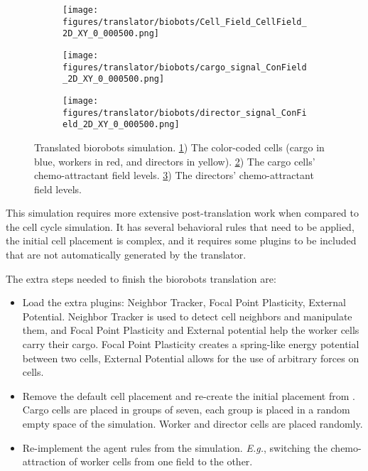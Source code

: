 \begin{figure}[H]
    \centering
    \begin{subfigure}{.45\textwidth}
        \texttt{[image: figures/translator/biobots/Cell\_Field\_CellField\_2D\_XY\_0\_000500.png]}
        \caption{}\label{fig:trans:biobot:1}
    \end{subfigure}
    \begin{subfigure}{.45\textwidth}
        \texttt{[image: figures/translator/biobots/cargo\_signal\_ConField\_2D\_XY\_0\_000500.png]}
        \caption{}\label{fig:trans:biobot:2}
    \end{subfigure}
% 
    \begin{subfigure}{.45\textwidth}
        \texttt{[image: figures/translator/biobots/director\_signal\_ConField\_2D\_XY\_0\_000500.png]}
        \caption{}\label{fig:trans:biobot:3}
    \end{subfigure}
    \caption{Translated biorobots simulation. \ref{fig:trans:biobot:1}) The color-coded cells (cargo in blue, workers in red, and directors in yellow). \ref{fig:trans:biobot:2}) The cargo cells' chemo-attractant field levels. \ref{fig:trans:biobot:3}) The directors' chemo-attractant field levels.}
    \label{fig:trans:biobot}
\end{figure}

This simulation requires more extensive post-translation work when compared to the cell cycle simulation. It has several behavioral rules that need to be applied, the initial cell placement is complex, and it requires some \ccds plugins to be included that are not automatically generated by the translator.

The extra steps needed to finish the biorobots translation are:

\begin{itemize}
    \item Load the extra plugins: Neighbor Tracker,  Focal Point Plasticity, External Potential. Neighbor Tracker is used to detect cell neighbors and manipulate them, and Focal Point Plasticity and External potential help the worker cells carry their cargo.  Focal Point Plasticity creates a spring-like energy potential between two cells, External Potential allows for the use of arbitrary forces on cells. 
    \item Remove the default cell placement and re-create the initial placement from \psc. Cargo cells are placed in groups of seven, each group is placed in a random empty space of the simulation. Worker and director cells are placed randomly.
    \item Re-implement the agent rules from the \pscs simulation. \textit{E.g.}, switching the chemo-attraction of worker cells from one field to the other.
\end{itemize}

